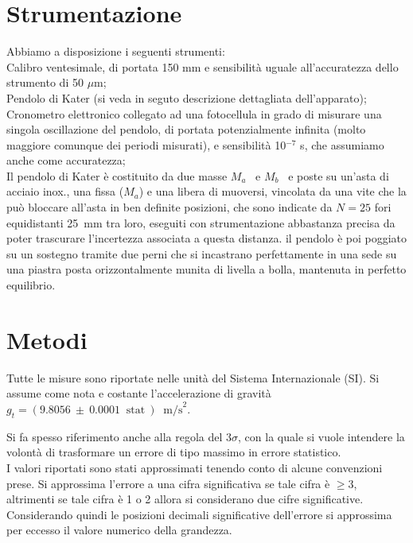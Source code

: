 \documentclass[italian, a4paper, 10pt, twocolumn]{../../style/lab_unige}
\newcommand{\treSigma}{$3\sigma$}
\newcommand{\gLab}{$g_t=(9.8056~\pm~0.0001~\text{ stat}~)~\text{ m/s}^2$}
\newcommand{\Ma}{$M_a$}
\newcommand{\Mb}{$M_b$}
\begin{document}
    \section{Strumentazione}
    \label{section:strument}
    Abbiamo a disposizione i seguenti strumenti:\\
    Calibro ventesimale, di portata 150 mm e sensibilità uguale all'accuratezza dello strumento di 
    50 $\mu$m;\\
    Pendolo di Kater (si veda in seguto descrizione dettagliata dell'apparato);\\
    Cronometro elettronico collegato ad una fotocellula in grado di misurare una singola oscillazione del pendolo, 
    di portata potenzialmente infinita (molto maggiore comunque dei periodi misurati), e sensibilità 10$^{-7}$ s, 
    che assumiamo anche come accuratezza;\\

    Il pendolo di Kater è costituito da due masse \Ma~ e \Mb~ e poste su un'asta di acciaio inox., una 
    fissa (\Ma) e una libera di muoversi, vincolata da una vite che la può bloccare all'asta in ben definite 
    posizioni, che sono indicate da $N=25$ fori equidistanti 25~mm tra loro, eseguiti con strumentazione abbastanza 
    precisa da poter trascurare l'incertezza associata a questa distanza. il pendolo è poi poggiato su un sostegno 
    tramite due perni che si incastrano perfettamente in una sede su una piastra posta orizzontalmente munita di 
    livella a bolla, mantenuta in perfetto equilibrio.

    \section{Metodi}
    \label{section:methods}
    Tutte le misure sono riportate nelle unità del Sistema Internazionale (SI). Si assume come nota e costante 
    l'accelerazione di gravità \gLab.

    
    Si fa spesso riferimento anche alla regola del \treSigma, con la quale si vuole intendere la volontà di 
    trasformare un errore di tipo massimo in errore statistico.\\%
    I valori riportati sono stati approssimati tenendo conto di alcune convenzioni prese. Si approssima 
    l'errore a una cifra significativa se tale cifra è $\geqslant3$, altrimenti se tale cifra è 1 o 2 allora
    si considerano due cifre significative. Considerando quindi le posizioni decimali significative dell'errore
    si approssima per eccesso il valore numerico della grandezza.
\end{document}
